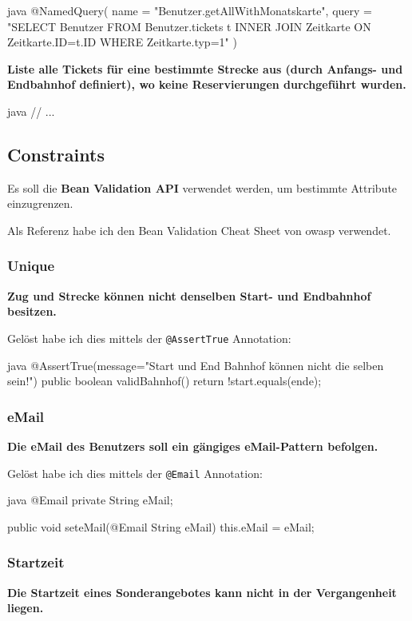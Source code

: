 \begin{code}{java}
@NamedQuery(
    name = "Benutzer.getAllWithMonatskarte",
    query = "SELECT Benutzer FROM Benutzer.tickets t INNER JOIN Zeitkarte ON Zeitkarte.ID=t.ID WHERE Zeitkarte.typ=1"
)
\end{code}

\textbf{Liste alle Tickets für eine bestimmte Strecke aus (durch Anfangs- und Endbahnhof definiert), wo keine Reservierungen durchgeführt wurden.}

\begin{code}{java}
// ...
\end{code}

\clearpage
\subsection{Constraints}

Es soll die \textbf{Bean Validation API} verwendet werden, um bestimmte Attribute einzugrenzen.

Als Referenz habe ich den Bean Validation Cheat Sheet von owasp \cite{owasp:beanValidationCheatSheet} verwendet.

\subsubsection{Unique}
\textbf{Zug und Strecke können nicht denselben Start- und Endbahnhof besitzen.}

Gelöst habe ich dies mittels der \texttt{@AssertTrue} Annotation:

\begin{code}{java}
@AssertTrue(message="Start und End Bahnhof können nicht die selben sein!")
public boolean validBahnhof() {
    return !start.equals(ende);
}
\end{code}

\subsubsection{eMail}
\textbf{Die eMail des Benutzers soll ein gängiges eMail-Pattern befolgen.}

Gelöst habe ich dies mittels der \texttt{@Email} Annotation:

\begin{code}{java}
@Email
private String eMail;

public void seteMail(@Email String eMail) {
    this.eMail = eMail;
}
\end{code}

\subsubsection{Startzeit}
\textbf{Die Startzeit eines Sonderangebotes kann nicht in der Vergangenheit liegen.}

